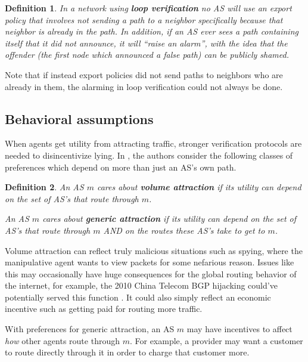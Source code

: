 \documentclass[10pt]{article}
\newtheorem{definition}{Definition}
\begin{document}
    \begin{definition}
      In a network using \textbf{loop verification} no AS will
      use an export policy that involves not sending a path to a neighbor
      specifically because that neighbor is already in the path.
      In addition, if
      an AS ever sees a path containing itself that it did not announce, it will
      ``raise an alarm'', with the idea that the offender (the first
      node which announced a false path) can be publicly shamed.
    \end{definition}

    Note that if instead export policies did not send paths to neighbors who are
    already in them, the alarming in loop verification could not always be done.

  \subsection{Behavioral assumptions}
    When agents get utility from attracting traffic, stronger verification
    protocols are needed to disincentivize lying.
    In \cite{Attraction}, the authors consider the following classes of
    preferences which depend on more than just an AS's own path.

    \begin{definition}
      An AS $m$ cares about \textbf{volume attraction} if its utility can depend on
      the set of AS's that route through $m$.
      
      An AS $m$ cares about \textbf{generic attraction} if its utility can depend on
      the set of AS's that route through $m$ AND on the routes these AS's take to get to $m$.
      \end{definition}

    Volume attraction can reflect truly malicious situations such as spying,
    where the manipulative agent wants to view packets for some nefarious
    reason. Issues like this may occasionally have huge consequences for the
    global routing behavior of the internet, for example, the 2010
    China Telecom BGP hijacking could've potentially served this function
    \cite{ChinaHijack}. It could also simply reflect an economic incentive such as
    getting paid for routing more traffic.
    
    With preferences for generic attraction, an AS $m$ may have incentives to affect
    \emph{how} other agents route through $m$.
    For example, a provider may want a customer to route directly through it
    in order to charge that customer more.
\end{document}
